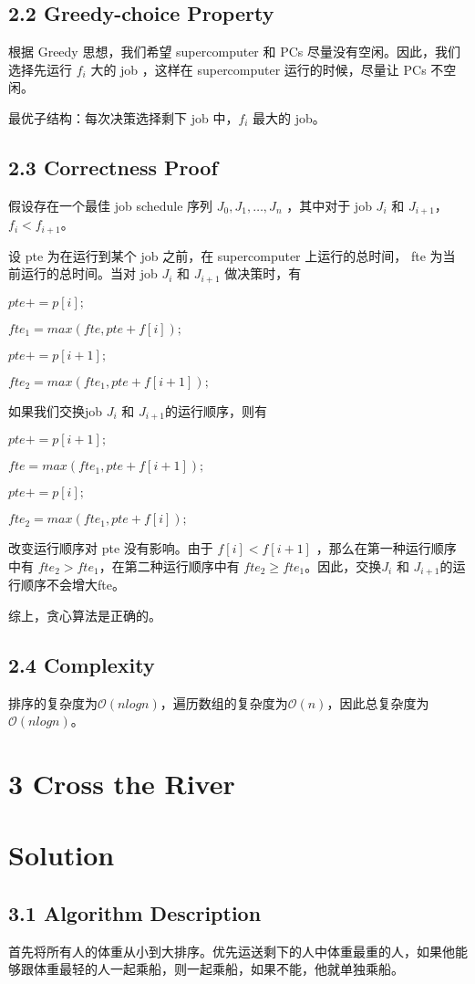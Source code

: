 \documentclass[UTF8]{ctexart}
\begin{document}
\subsection*{2.2 Greedy-choice Property} 
根据 Greedy 思想，我们希望 supercomputer 和 PCs 尽量没有空闲。因此，我们选择先运行 $f_i$ 大的 job ，这样在 supercomputer 运行的时候，尽量让 PCs 不空闲。

最优子结构：每次决策选择剩下 job 中，$f_i$ 最大的 job。
\subsection*{2.3 Correctness Proof } 
假设存在一个最佳 job schedule 序列 $J_0, J_1,\dots, J_n$ ，其中对于 job $J_i$ 和 $J_{i+1}$，$f_i < f_{i+1}$。

设 pte 为在运行到某个 job 之前，在 supercomputer 上运行的总时间， fte 为当前运行的总时间。当对 job  $J_i$ 和 $J_{i+1}$ 做决策时，有 

$pte += p[i]; $

$fte_1 = max(fte, pte+f[i]); $

$pte += p[i+1]; $

$fte_2 = max(fte_1, pte+f[i+1]);$

如果我们交换job $J_i$ 和 $J_{i+1}$的运行顺序，则有

$pte += p[i+1]; $

$fte = max(fte_1, pte+f[i+1]); $

$pte += p[i]; $

$fte_2 = max(fte_1, pte+f[i]);$

改变运行顺序对 pte 没有影响。由于 $f[i] < f[i+1]$ ，那么在第一种运行顺序中有 $fte_2 > fte_1$，在第二种运行顺序中有 $fte_2 \ge fte_1$。因此，交换$J_i$ 和 $J_{i+1}$的运行顺序不会增大fte。

综上，贪心算法是正确的。
\subsection*{2.4 Complexity}
排序的复杂度为$\mathcal{O}(nlogn)$，遍历数组的复杂度为$\mathcal{O}(n)$，因此总复杂度为$\mathcal{O}(nlogn)$。

\section*{3 Cross the River}

\section*{Solution}
\subsection*{3.1 Algorithm Description} 
首先将所有人的体重从小到大排序。优先运送剩下的人中体重最重的人，如果他能够跟体重最轻的人一起乘船，则一起乘船，如果不能，他就单独乘船。
\end{document}
